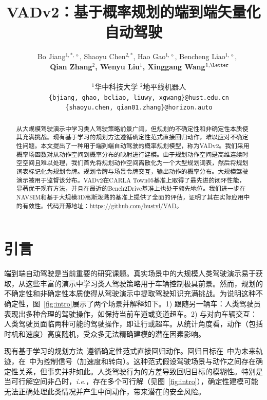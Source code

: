 \documentclass{article} %
\title{VADv2：基于概率规划的端到端矢量化自动驾驶}
\author{
    \quad \quad \ \ Bo Jiang$^{1, *,\diamond}$, \quad Shaoyu Chen$^{2,*}$, \quad Hao Gao$^{1,\diamond}$, \quad Bencheng Liao$^{1,\diamond}$, \\
    \textbf{\quad \quad \ \ \ Qian Zhang$^{2}$, \quad Wenyu Liu$^{1}$, \quad Xinggang Wang$^{1,\textrm{\Letter}}$} \\
    \\
    \quad \quad \ \ \ $^1$华中科技大学 \quad $^2$地平线机器人 \\
    \quad \quad \ \ \ \texttt{\{bjiang, ghao, bcliao, liuwy, xgwang\}@hust.edu.cn} \\
    \quad \quad \ \ \ \texttt{\{shaoyu.chen, qian01.zhang\}@horizon.auto}
}
\newcommand{\onedot}{.\xspace}
\def\ie{\emph{i.e}\onedot} \def\Ie{\emph{I.e}\onedot}
\begin{document}
\maketitle

\begin{abstract}
从大规模驾驶演示中学习类人驾驶策略前景广阔，但规划的不确定性和非确定性本质使其充满挑战。现有基于学习的规划方法遵循确定性范式直接回归动作，难以应对不确定性问题。本文提出了一种用于端到端自动驾驶的概率规划模型，称为VADv2。我们采用概率场函数对从动作空间到概率分布的映射进行建模。由于规划动作空间是高维连续时空空间且难以处理，我们首先将规划动作空间离散化为一个大型规划词表，然后将规划词表标记化为规划令牌。规划令牌与场景令牌交互，输出动作的概率分布。大规模驾驶演示被用于监督该分布。VADv2在CARLA Town05基准上取得了最先进的闭环性能，显著优于现有方法，并且在最近的Bench2Drive基准上也处于领先地位。我们进一步在NAVSIM和基于大规模3D高斯泼溅的基准上提供了全面的评估，证明了其在实际应用中的有效性。代码开源地址：\textcolor{magenta}{\url{https://github.com/hustvl/VAD}}。
\end{abstract}

\let\thefootnote\relax{}

\section{引言}
\label{sec:introduction}

端到端自动驾驶是当前重要的研究课题。真实场景中的大规模人类驾驶演示易于获取，从这些丰富的演示中学习类人驾驶策略用于车辆控制极具前景。然而，规划的不确定性和非确定性本质使得从驾驶演示中提取驾驶知识充满挑战。为说明这种不确定性，图~\ref{fig:intro}展示了两个场景并解释如下。1) 跟随另一辆车：人类驾驶员表现出多种合理的驾驶操作，如保持当前车道或变道超车。2) 与对向车辆交互：人类驾驶员面临两种可能的驾驶操作，即让行或超车。从统计角度看，动作（包括时机和速度）高度随机，受众多无法精确建模的潜在因素影响。

现有基于学习的规划方法~\citep{vad, uniad, thinktwice, transfuser, mile, roach}遵循确定性范式直接回归动作。回归目标在~\citep{vad, uniad, thinktwice, transfuser}中为未来轨迹，在~\citep{mile, roach}中为控制信号（加速度和转向）。这种范式假设驾驶场景与动作之间存在确定性关系，但事实并非如此。人类驾驶行为的方差导致回归目标的模糊性。特别是当可行解空间非凸时，\ie，存在多个可行解（见图~\ref{fig:intro}），确定性建模可能无法正确处理此类情况并产生中间动作，带来潜在的安全风险。
\end{document}
